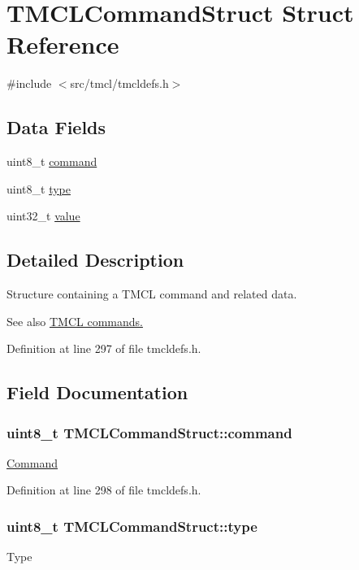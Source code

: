 \hypertarget{structTMCLCommandStruct}{
\section{TMCLCommandStruct Struct Reference}
\label{structTMCLCommandStruct}
}


{\ttfamily \#include $<$src/tmcl/tmcldefs.h$>$}\subsection*{Data Fields}
\begin{DoxyCompactItemize}
\item 
uint8\_\-t \hyperlink{structTMCLCommandStruct_a854a52c07ac09c05f30561380a1490fe}{command}
\item 
uint8\_\-t \hyperlink{structTMCLCommandStruct_ae007ea99cf6d0c077179ba55dd565753}{type}
\item 
uint32\_\-t \hyperlink{structTMCLCommandStruct_a46541ffc394c6c80950436398ba13266}{value}
\end{DoxyCompactItemize}


\subsection{Detailed Description}
Structure containing a TMCL command and related data.

\begin{DoxySeeAlso}{See also}
\hyperlink{group__TMCLComm}{TMCL commands.} 
\end{DoxySeeAlso}


Definition at line 297 of file tmcldefs.h.

\subsection{Field Documentation}
\hypertarget{structTMCLCommandStruct_a854a52c07ac09c05f30561380a1490fe}{
\subsubsection[{command}]{\setlength{\rightskip}{0pt plus 5cm}uint8\_\-t {\bf TMCLCommandStruct::command}}}
\label{structTMCLCommandStruct_a854a52c07ac09c05f30561380a1490fe}
\hyperlink{group__TMCLComm}{Command} 

Definition at line 298 of file tmcldefs.h.\hypertarget{structTMCLCommandStruct_ae007ea99cf6d0c077179ba55dd565753}{
\subsubsection[{type}]{\setlength{\rightskip}{0pt plus 5cm}uint8\_\-t {\bf TMCLCommandStruct::type}}}
\label{structTMCLCommandStruct_ae007ea99cf6d0c077179ba55dd565753}
Type 

